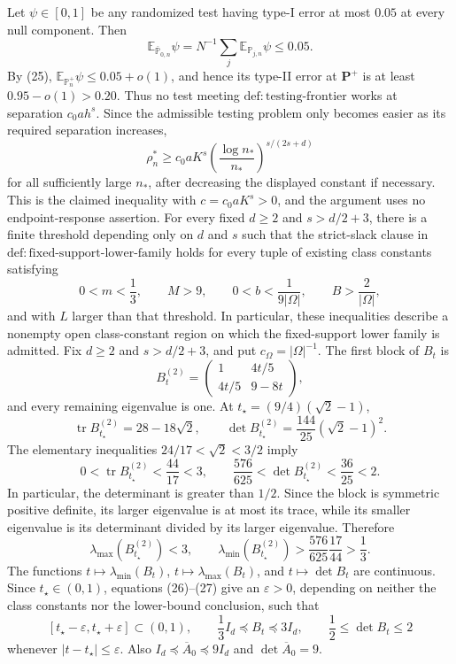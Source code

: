Let \(\psi\in[0,1]\) be any randomized test having type-I error at most \(0.05\) at every null component.  Then
\[
 \mathbb E_{\overline{\mathbb P}_{0,n}}\psi
 =N^{-1}\sum_j\mathbb E_{\mathbb P_{j,n}}\psi\le0.05.
\]
By (25), \(\mathbb E_{\mathbb P_n^+}\psi\le0.05+o(1)\), and hence its type-II error at \(\mathbf P^+\) is at least \(0.95-o(1)>0.20\).  Thus no test meeting \(\mathrm{def:testing\text{-}frontier}\) works at separation \(c_0ah^s\).  Since the admissible testing problem only becomes easier as its required separation increases,
\[
 \rho_n^\ast\ge c_0aK^s
 \left(\frac{\log n_\ast}{n_\ast}\right)^{s/(2s+d)}
\]
for all sufficiently large \(n_\ast\), after decreasing the displayed constant if necessary.  This is the claimed inequality with \(c=c_0aK^s>0\), and the argument uses no endpoint-response assertion.
For every fixed \(d\ge2\) and \(s>d/2+3\), there is a finite threshold depending only on \(d\) and \(s\) such that the strict-slack clause in \(\mathrm{def:fixed\text{-}support\text{-}lower\text{-}family}\) holds for every tuple of existing class constants satisfying
\[
 0<m<\frac13,\qquad M>9,\qquad
 0<b<\frac{1}{9\lvert\Omega\rvert},\qquad
 B>\frac{2}{\lvert\Omega\rvert},
\]
and with \(L\) larger than that threshold.  In particular, these inequalities describe a nonempty open class-constant region on which the fixed-support lower family is admitted.
Fix \(d\ge2\) and \(s>d/2+3\), and put \(c_\Omega=\lvert\Omega\rvert^{-1}\).  The first block of \(B_t\) is
\[
 B_t^{(2)}=
 \begin{pmatrix}1&4t/5\\4t/5&9-8t\end{pmatrix},
\]
and every remaining eigenvalue is one.  At \(t_\star=(9/4)(\sqrt2-1)\),
\[
 \operatorname{tr}B_{t_\star}^{(2)}=28-18\sqrt2,
 \qquad
 \det B_{t_\star}^{(2)}
 =\frac{144}{25}(\sqrt2-1)^2.
 \tag{26}
\]
The elementary inequalities \(24/17<\sqrt2<3/2\) imply
\[
 0<\operatorname{tr}B_{t_\star}^{(2)}<\frac{44}{17}<3,
 \qquad
 \frac{576}{625}<\det B_{t_\star}^{(2)}<\frac{36}{25}<2.
\]
In particular, the determinant is greater than \(1/2\).  Since the block is symmetric positive definite, its larger eigenvalue is at most its trace, while its smaller eigenvalue is its determinant divided by its larger eigenvalue.  Therefore
\[
 \lambda_{\max}(B_{t_\star}^{(2)})<3,
 \qquad
 \lambda_{\min}(B_{t_\star}^{(2)})
 >\frac{576}{625}\frac{17}{44}>\frac13.
 \tag{27}
\]
The functions \(t\mapsto\lambda_{\min}(B_t)\), \(t\mapsto\lambda_{\max}(B_t)\), and \(t\mapsto\det B_t\) are continuous.  Since \(t_\star\in(0,1)\), equations (26)--(27) give an \(\varepsilon>0\), depending on neither the class constants nor the lower-bound conclusion, such that
\[
 [t_\star-\varepsilon,t_\star+\varepsilon]\subset(0,1),
 \qquad
 \frac13 I_d\preceq B_t\preceq3I_d,
 \qquad
 \frac12\le\det B_t\le2
 \tag{28}
\]
whenever \(\lvert t-t_\star\rvert\le\varepsilon\).  Also \(I_d\preceq\overline A_0\preceq9I_d\) and \(\det\overline A_0=9\).

